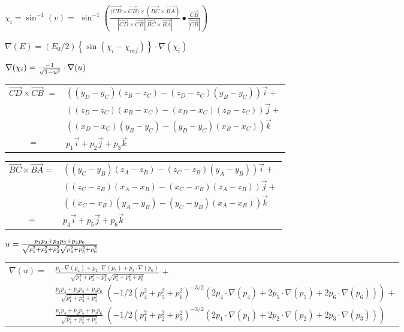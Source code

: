 $\chi _{i}=\sin ^{-1}(v)=$ $\sin ^{-1}\left( \frac{\overrightarrow{(CD}
\times \overrightarrow{CB})\times (\overrightarrow{BC}\times \overrightarrow{
BA})}{\left| \overrightarrow{CD}\times \overrightarrow{CB}\right| \left| 
\overrightarrow{BC}\times \overrightarrow{BA}\right| }\bullet \frac{
\overrightarrow{CB}}{\left| \overrightarrow{CB}\right| }\right) $

$\nabla (E)=(E_{0}/2)\left\{ \sin \left( \chi _{i}-\chi _{ref}\right)
\right\} \cdot \nabla (\chi _{i})$

$\nabla (\chi _{i})=\frac{-1}{\sqrt{1-u^{2}}}\cdot \nabla (u)\smallskip
\medskip $

\begin{tabular}{ll}
$\overrightarrow{CD}\times \overrightarrow{CB}$ $=$ & $
((y_{D}-y_{C})(z_{B}-z_{C})-(z_{D}-z_{C})(y_{B}-y_{C}))\overrightarrow{i}+$
\\ 
& $((z_{D}-z_{C})(x_{B}-x_{C})-(x_{D}-x_{C})(z_{B}-z_{C}))\overrightarrow{j}+
$ \\ 
& $((x_{D}-x_{C})(y_{B}-y_{C})-(y_{D}-y_{C})(x_{B}-x_{C}))\overrightarrow{k}$
\\ 
\multicolumn{1}{c}{$=$} & $p_{1}\overrightarrow{i}+p_{2}\overrightarrow{j}
+p_{3}\overrightarrow{k}$
\end{tabular}
\medskip \medskip 

\begin{tabular}{ll}
$\overrightarrow{BC}\times \overrightarrow{BA}=$ & $
((y_{C}-y_{B})(z_{A}-z_{B})-(z_{C}-z_{B})(y_{A}-y_{B}))\overrightarrow{i}+$
\\ 
& $((z_{C}-z_{B})(x_{A}-x_{B})-(x_{C}-x_{B})(z_{A}-z_{B}))\overrightarrow{j}+
$ \\ 
& $((x_{C}-x_{B})(y_{A}-y_{B})-(y_{C}-y_{B})(x_{A}-x_{B}))\overrightarrow{k}$
\\ 
\multicolumn{1}{c}{$=$} & $p_{4}\overrightarrow{i}+p_{5}\overrightarrow{j}
+p_{6}\overrightarrow{k}$
\end{tabular}
\medskip \medskip 

$u=\frac{p_{1}p_{4}+p_{2}p_{5}+p_{3}p_{6}}{\sqrt{
p_{1}^{2}+p_{2}^{2}+p_{3}^{2}}\sqrt{p_{4}^{2}+p_{5}^{2}+p_{6}^{2}}}\medskip
\medskip $

\begin{tabular}{ll}
$\nabla (u)=$ & $\frac{p_{1}\cdot \nabla (p_{4})+p_{2}\cdot \nabla
(p_{5})+p_{3}\cdot \nabla (p_{6})}{\sqrt{p_{1}^{2}+p_{2}^{2}+p_{3}^{2}}\sqrt{
p_{4}^{2}+p_{5}^{2}+p_{6}^{2}}}$ $+$ \\ 
& $\frac{p_{1}p_{4}+p_{2}p_{5}+p_{3}p_{6}}{\sqrt{
p_{1}^{2}+p_{2}^{2}+p_{3}^{2}}}$ $\left( -1/2\left(
p_{4}^{2}+p_{5}^{2}+p_{6}^{2}\right) ^{-3/2}\left( 2p_{4}\cdot \nabla
(p_{4})+2p_{5}\cdot \nabla (p_{5})+2p_{6}\cdot \nabla (p_{6})\right) \right) 
$ $+$ \\ 
& $\frac{p_{1}p_{4}+p_{2}p_{5}+p_{3}p_{6}}{\sqrt{
p_{4}^{2}+p_{5}^{2}+p_{6}^{2}}}$ $\left( -1/2\left(
p_{1}^{2}+p_{2}^{2}+p_{3}^{2}\right) ^{-3/2}\left( 2p_{1}\cdot \nabla
(p_{1})+2p_{2}\cdot \nabla (p_{2})+2p_{3}\cdot \nabla (p_{3})\right) \right) 
$
\end{tabular}

